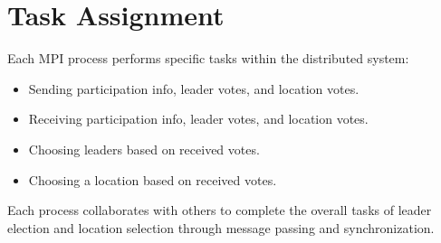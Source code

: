 \documentclass{article}
\begin{document}
\section{Task Assignment}
Each MPI process performs specific tasks within the distributed system:
\begin{itemize}
  \item Sending participation info, leader votes, and location votes.
  \item Receiving participation info, leader votes, and location votes.
  \item Choosing leaders based on received votes.
  \item Choosing a location based on received votes.
\end{itemize}
Each process collaborates with others to complete the overall tasks of leader election and location selection through message passing and synchronization.
\end{document}
